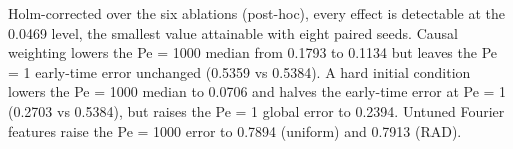 Holm-corrected over the six ablations (post-hoc), every effect is detectable at the 0.0469 level, the smallest
value attainable with eight paired seeds. Causal weighting lowers the Pe = 1000 median from 0.1793 to 0.1134 but
leaves the Pe = 1 early-time error unchanged (0.5359 vs 0.5384). A hard initial condition lowers the Pe = 1000
median to 0.0706 and halves the early-time error at Pe = 1 (0.2703 vs 0.5384), but raises the Pe = 1 global
error to 0.2394. Untuned Fourier features raise the Pe = 1000 error to 0.7894 (uniform) and 0.7913 (RAD).

